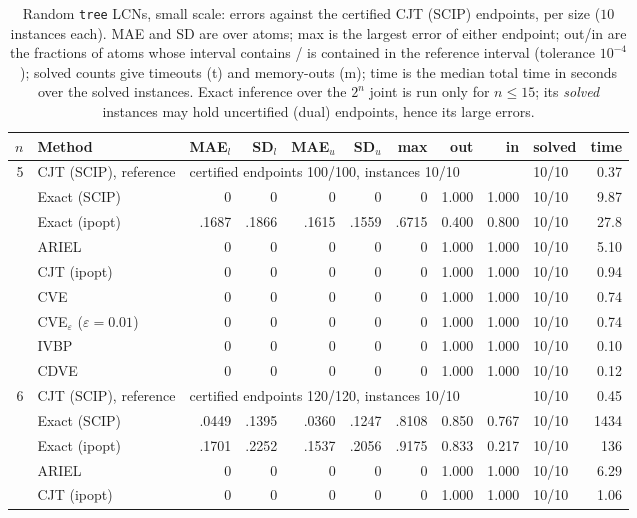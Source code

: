 \begin{table}[htbp]
\centering
\scriptsize
\caption{Random \texttt{tree} LCNs, small scale: errors against the certified CJT (SCIP) endpoints, per size ($10$ instances each). MAE and SD are over atoms; max is the largest error of either endpoint; out/in are the fractions of atoms whose interval contains / is contained in the reference interval (tolerance $10^{-4}$); solved counts give timeouts (t) and memory-outs (m); time is the median total time in seconds over the solved instances. Exact inference over the $2^n$ joint is run only for $n \le 15$; its \emph{solved} instances may hold uncertified (dual) endpoints, hence its large errors.}
\label{tab:full-tree-small}
\begin{tabular}{rlrrrrrrrlr}
\toprule
$n$ & Method & MAE$_l$ & SD$_l$ & MAE$_u$ & SD$_u$ & max & out & in & solved & time \\
\midrule
5 & CJT (SCIP), reference & \multicolumn{7}{l}{certified endpoints 100/100, instances 10/10} & 10/10 & 0.37 \\
 & Exact (SCIP) & 0 & 0 & 0 & 0 & 0 & 1.000 & 1.000 & 10/10 & 9.87 \\
 & Exact (ipopt) & .1687 & .1866 & .1615 & .1559 & .6715 & 0.400 & 0.800 & 10/10 & 27.8 \\
 & ARIEL & 0 & 0 & 0 & 0 & 0 & 1.000 & 1.000 & 10/10 & 5.10 \\
 & CJT (ipopt) & 0 & 0 & 0 & 0 & 0 & 1.000 & 1.000 & 10/10 & 0.94 \\
 & CVE & 0 & 0 & 0 & 0 & 0 & 1.000 & 1.000 & 10/10 & 0.74 \\
 & CVE$_\varepsilon$ ($\varepsilon{=}0.01$) & 0 & 0 & 0 & 0 & 0 & 1.000 & 1.000 & 10/10 & 0.74 \\
 & IVBP & 0 & 0 & 0 & 0 & 0 & 1.000 & 1.000 & 10/10 & 0.10 \\
 & CDVE & 0 & 0 & 0 & 0 & 0 & 1.000 & 1.000 & 10/10 & 0.12 \\
\midrule
6 & CJT (SCIP), reference & \multicolumn{7}{l}{certified endpoints 120/120, instances 10/10} & 10/10 & 0.45 \\
 & Exact (SCIP) & .0449 & .1395 & .0360 & .1247 & .8108 & 0.850 & 0.767 & 10/10 & 1434 \\
 & Exact (ipopt) & .1701 & .2252 & .1537 & .2056 & .9175 & 0.833 & 0.217 & 10/10 & 136 \\
 & ARIEL & 0 & 0 & 0 & 0 & 0 & 1.000 & 1.000 & 10/10 & 6.29 \\
 & CJT (ipopt) & 0 & 0 & 0 & 0 & 0 & 1.000 & 1.000 & 10/10 & 1.06 \\

\end{tabular}
\end{table}
